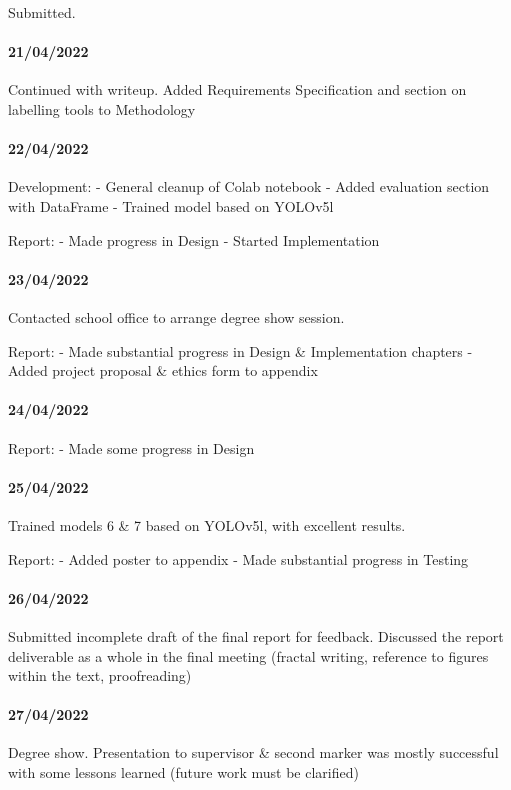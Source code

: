 \begin{appendices}
Submitted. 

\paragraph{21/04/2022}
Continued with writeup. Added Requirements Specification and section on labelling tools to Methodology

\paragraph{22/04/2022}
Development:
- General cleanup of Colab notebook
- Added evaluation section with DataFrame
- Trained model based on YOLOv5l

Report:
- Made progress in Design
- Started Implementation

\paragraph{23/04/2022}
Contacted school office to arrange degree show session. 

Report:
- Made substantial progress in Design \& Implementation chapters
- Added project proposal \& ethics form to appendix

\paragraph{24/04/2022}
Report:
- Made some progress in Design

\paragraph{25/04/2022}
Trained models 6 \& 7 based on YOLOv5l, with excellent results.

Report:
- Added poster to appendix
- Made substantial progress in Testing

\paragraph{26/04/2022}
Submitted incomplete draft of the final report for feedback. Discussed the report deliverable as a whole in the final meeting (fractal writing, reference to figures within the text, proofreading)

\paragraph{27/04/2022}
Degree show. Presentation to supervisor & second marker was mostly successful with some lessons learned (future work must be clarified)


\end{appendices}
